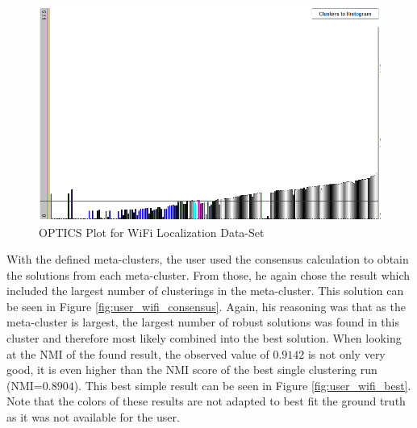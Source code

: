 \documentclass[
	a4paper,
	english,
	twoside,
	openright,               
	11pt                            
	]{report}
\begin{document}
\begin{figure}[h]
	\centering
	\includegraphics[scale=.6]{user_wifi_optics}
	\caption{OPTICS Plot for WiFi Localization Data-Set}
	\label{fig:user_wifi_optics}
\end{figure}

With the defined meta-clusters, the user used the consensus calculation to obtain the solutions from each meta-cluster. From those, he again chose the result which included the largest number of clusterings in the meta-cluster. This solution can be seen in Figure \ref{fig:user_wifi_consensus}. Again, his reasoning was that as the meta-cluster is largest, the largest number of robust solutions was found in this cluster and therefore most likely combined into the best solution. When looking at the NMI of the found result, the observed value of $0.9142$ is not only very good, it is even higher than the NMI score of the best single clustering run (NMI=$0.8904$). This best simple result can be seen in Figure \ref{fig:user_wifi_best}. Note that the colors of these results are not adapted to best fit the ground truth as it was not available for the user.
\end{document}
